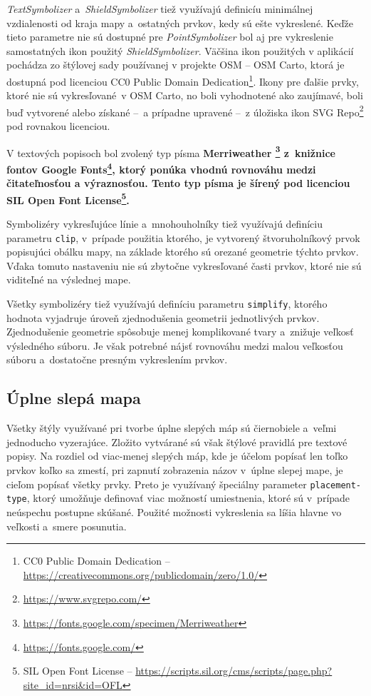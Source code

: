 {\it TextSymbolizer} a~{\it ShieldSymbolizer} tiež využívajú definicíu minimálnej vzdialenosti od kraja mapy a~ostatných prvkov, kedy sú ešte vykreslené. Keďže tieto parametre nie sú dostupné pre {\it PointSymbolizer} bol aj pre vykreslenie samostatných ikon použitý {\it ShieldSymbolizer}. Väčšina ikon použitých v aplikácií pochádza zo štýlovej sady používanej v projekte OSM -- OSM Carto, ktorá je dostupná pod licenciou CC0 Public Domain Dedication\footnote{CC0 Public Domain Dedication -- \url{https://creativecommons.org/publicdomain/zero/1.0/}}. Ikony pre ďalšie prvky, ktoré nie sú vykresľované~v OSM Carto, no boli vyhodnotené ako zaujímavé, boli buď vytvorené alebo získané --~a prípadne upravené --~z úložiska ikon SVG Repo\footnote{\url{https://www.svgrepo.com/}} pod rovnakou licenciou. 

V textových popisoch bol zvolený typ písma \bf Merriweather \rm\footnote{\url{https://fonts.google.com/specimen/Merriweather}} z~knižnice fontov \bf Google Fonts\rm\footnote{\url{https://fonts.google.com/}}, ktorý ponúka vhodnú rovnováhu medzi čitateľnosťou a výraznosťou. Tento typ písma je šírený pod licenciou SIL Open Font License\footnote{SIL Open Font License -- \url{https://scripts.sil.org/cms/scripts/page.php?site_id=nrsi&id=OFL}}.

Symbolizéry vykresľujúce línie a~mnohouholníky tiež využívajú definíciu parametru {\tt clip}, v~prípade použitia ktorého, je vytvorený štvoruholníkový prvok popisujúci obálku mapy, na základe ktorého sú orezané geometrie týchto prvkov. Vďaka tomuto nastaveniu nie sú zbytočne vykresľované časti prvkov, ktoré nie sú viditeľné na výslednej mape. 

Všetky symbolizéry tiež využívajú definíciu parametru {\tt simplify}, ktorého hodnota vyjadruje úroveň zjednodušenia geometrii jednotlivých prvkov. Zjednodušenie geometrie spôsobuje menej komplikované tvary a~znižuje veľkosť výsledného súboru. Je však potrebné nájsť rovnováhu medzi malou veľkosťou súboru a~dostatočne presným vykreslením prvkov.

\subsection*{Úplne slepá mapa}
Všetky štýly využívané pri tvorbe úplne slepých máp sú čiernobiele a~veľmi jednoducho vyzerajúce. Zložito vytvárané sú však štýlové pravidlá pre textové popisy. Na rozdiel od viac-menej slepých máp, kde je účelom popísať len toľko prvkov koľko sa zmestí, pri zapnutí zobrazenia názov v~úplne slepej mape, je cieľom popísať všetky prvky. Preto je využívaný špeciálny parameter {\tt placement-type}, ktorý umožňuje definovať viac možností umiestnenia, ktoré sú v~prípade neúspechu postupne skúšané. Použité možnosti vykreslenia sa líšia hlavne vo veľkosti a~smere posunutia.


